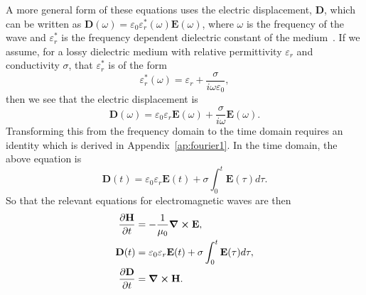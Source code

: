 \documentclass[12pt]{article}
\begin{document}
\begin{multicols}{2}
A more general form of these equations uses the electric displacement, $\mathbf{D}$, which can be written as $\mathbf{D}(\omega) = \varepsilon_0\varepsilon_r^*(\omega)\mathbf{E}(\omega)$, where $\omega$ is the frequency of the wave and $\varepsilon^*_r$ is the frequency dependent dielectric constant of the medium~\cite{Sullivan00}. If we assume, for a lossy dielectric medium with relative permittivity $\varepsilon_r$ and conductivity $\sigma$, that $\varepsilon^*_r$ is of the form
\begin{equation}
\label{eq:epsilon_form}
\varepsilon^*_r(\omega) = \varepsilon_r + \frac{\sigma}{i\omega\varepsilon_0},
\end{equation}
then we see that the electric displacement is
\begin{equation}
\mathbf{D}(\omega) = \varepsilon_0\varepsilon_r \mathbf{E}(\omega) + \frac{\sigma}{i\omega}\mathbf{E}(\omega).
\end{equation}
Transforming this from the frequency domain to the time domain requires an identity which is derived in Appendix~\ref{ap:fourier1}. In the time domain, the above equation is
\begin{equation}
\mathbf{D}(t) = \varepsilon_0\varepsilon_r \mathbf{E}(t)+\sigma\int_0^t\mathbf{E}(\tau)d\tau.
\end{equation}
So that the relevant equations for electromagnetic waves are then
\begin{subequations}
\begin{align}
\label{eq:dH_dt_SI}\frac{\partial\mathbf{H}}{\partial t} &= -\frac{1}{\mu_0}\curl{\mathbf{E}}, \\
\label{eq:D_time_SI}\mathbf{D}(t) &= \varepsilon_0\varepsilon_r \mathbf{E}(t)+\sigma\int_0^t\mathbf{E}(\tau)d\tau, \\
\label{eq:dD_dt_SI}\frac{\partial\mathbf{D}}{\partial t} &= \curl{\mathbf{H}}.
\end{align}
\end{subequations}


\end{multicols}
\end{document}

